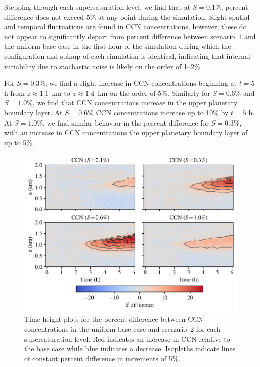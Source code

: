Stepping through each supersaturation level, we find that at $S=0.1\%$, percent difference does not exceed 5\% at any point during the simulation. Slight spatial and temporal fluctuations are found in CCN concentrations, however, these do not appear to significantly depart from percent difference between scenario~1 and the uniform base case in the first hour of the simulation during which the configuration and spinup of each simulation is identical, indicating that internal variability due to stochastic noise is likely on the order of 1--2\%.

For $S=0.3\%$, we find a slight increase in CCN concentrations beginning at $t=5$ h from $z\approx1.1$~km to $z\approx1.4$~km on the order of 5\%. Similarly for $S=0.6\%$ and $S=1.0\%$, we find that CCN concentrations increase in the upper planetary boundary layer. At $S=0.6\%$ CCN concentrations increase up to 10\% by $t=5$ h. At $S=1.0\%$, we find similar behavior in the percent difference for $S=0.3\%$, with an increase in CCN concentrations the upper planetary boundary layer of up to 5\%.

\begin{figure}[!t]
  \centering
    \includegraphics[width=\textwidth]{figures/chapter5/height-time-ccn-pdiff-road-10x.pdf}
    \caption{Time-height plots for the percent difference between CCN concentrations in the uniform base case and scenario~2 for each supersaturation level. Red indicates an increase in CCN relative to the base case while blue indicates a decrease. Isopleths indicate lines of constant percent difference in increments of 5\%.}
    \label{fig:ht-ccn-pdiff-s2}
\end{figure}

